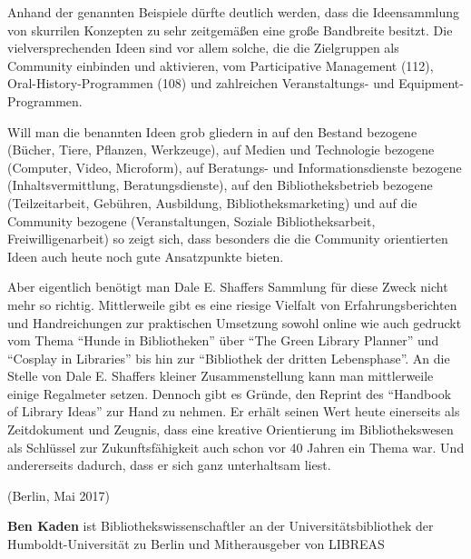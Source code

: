 \documentclass[a4paper,
fontsize=11pt,
oneside,
numbers=noperiodatend,
parskip=half-,
bibliography=totoc,
final
]{scrartcl}
\begin{document}
Anhand der genannten Beispiele dürfte deutlich werden, dass die
Ideensammlung von skurrilen Konzepten zu sehr zeitgemäßen eine große
Bandbreite besitzt. Die vielversprechenden Ideen sind vor allem solche,
die die Zielgruppen als Community einbinden und aktivieren, vom
Participative Management (112), Oral-History-Programmen (108) und
zahlreichen Veranstaltungs- und Equipment-Programmen.

Will man die benannten Ideen grob gliedern in auf den Bestand bezogene
(Bücher, Tiere, Pflanzen, Werkzeuge), auf Medien und Technologie
bezogene (Computer, Video, Microform), auf Beratungs- und
Informationsdienste bezogene (Inhaltsvermittlung, Beratungsdienste), auf
den Bibliotheksbetrieb bezogene (Teilzeitarbeit, Gebühren, Ausbildung,
Bibliotheksmarketing) und auf die Community bezogene (Veranstaltungen,
Soziale Bibliotheksarbeit, Freiwilligenarbeit) so zeigt sich, dass
besonders die die Community orientierten Ideen auch heute noch gute
Ansatzpunkte bieten.

Aber eigentlich benötigt man Dale E. Shaffers Sammlung für diese Zweck
nicht mehr so richtig. Mittlerweile gibt es eine riesige Vielfalt von
Erfahrungsberichten und Handreichungen zur praktischen Umsetzung sowohl
online wie auch gedruckt vom Thema \enquote{Hunde in Bibliotheken} über
\enquote{The Green Library Planner} und \enquote{Cosplay in Libraries}
bis hin zur \enquote{Bibliothek der dritten Lebensphase}. An die Stelle
von Dale E. Shaffers kleiner Zusammenstellung kann man mittlerweile
einige Regalmeter setzen. Dennoch gibt es Gründe, den Reprint des
\enquote{Handbook of Library Ideas} zur Hand zu nehmen. Er erhält seinen
Wert heute einerseits als Zeitdokument und Zeugnis, dass eine kreative
Orientierung im Bibliothekswesen als Schlüssel zur Zukunftsfähigkeit
auch schon vor 40 Jahren ein Thema war. Und andererseits dadurch, dass
er sich ganz unterhaltsam liest.

(Berlin, Mai 2017)

\textbf{Ben Kaden} ist Bibliothekswissenschaftler an der
Universitätsbibliothek der Humboldt-Universität zu Berlin und
Mitherausgeber von LIBREAS
\end{document}
